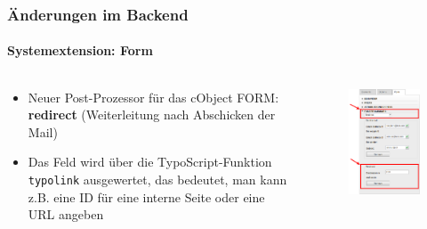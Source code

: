 \begin{frame}[fragile]
	\frametitle{Änderungen im Backend}
	\framesubtitle{Systemextension: Form}

	\begin{columns}[T]

		\begin{column}{.5\textwidth}
			\begin{itemize}
				\item Neuer Post-Prozessor für das cObject FORM: \textbf{redirect}\newline
					(Weiterleitung nach Abschicken der Mail)
				\item Das Feld wird über die TypoScript-Funktion \texttt{typolink} ausgewertet,\newline
					das bedeutet, man kann z.B. eine ID für eine interne Seite oder eine URL angeben
			\end{itemize}
		\end{column}

		\begin{column}{.5\textwidth}
			\begin{figure}\vspace*{-0.4cm}
				\includegraphics[width=0.65\linewidth]{Images/BackendChanges/FormRedirectPostProcessor.png}
			\end{figure}
		\end{column}

	\end{columns}

\end{frame}

